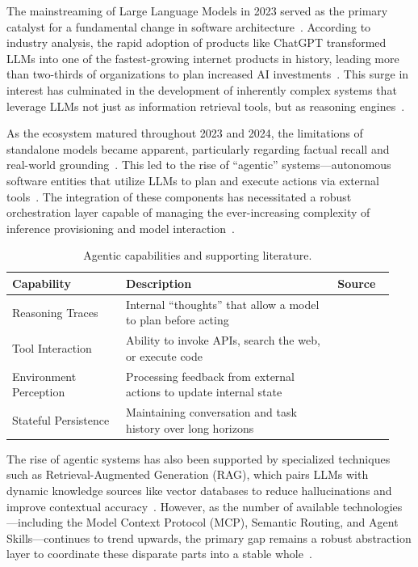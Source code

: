 \documentclass[sigconf,nonacm]{acmart}
\begin{document}
The mainstreaming of Large Language Models in 2023 served as the primary
catalyst for a fundamental change in software
architecture~\cite{benaich2023stateofai}. According to industry analysis,
the rapid adoption of products like ChatGPT transformed LLMs into one of
the fastest-growing internet products in history, leading more than
two-thirds of organizations to plan increased AI
investments~\cite{benaich2023stateofai}. This surge in interest has
culminated in the development of inherently complex systems that leverage
LLMs not just as information retrieval tools, but as reasoning
engines~\cite{crewai2024}.

As the ecosystem matured throughout 2023 and 2024, the limitations of
standalone models became apparent, particularly regarding factual recall and
real-world grounding~\cite{lewis2020rag}. This led to the rise of
``agentic'' systems---autonomous software entities that utilize LLMs to plan
and execute actions via external tools~\cite{yao2023react,schick2023toolformer}.
The integration of these components has necessitated a robust orchestration
layer capable of managing the ever-increasing complexity of inference
provisioning and model interaction~\cite{autogen2024}.

\begin{table}[t]
  \centering
  \caption{Agentic capabilities and supporting literature.}
  \label{tab:agentic-capabilities}
  \small
  \begin{tabular}{@{}p{0.28\linewidth}p{0.52\linewidth}p{0.14\linewidth}@{}}
    \toprule
    \textbf{Capability} & \textbf{Description} & \textbf{Source} \\
    \midrule
    Reasoning Traces & Internal ``thoughts'' that allow a model to plan before acting & \cite{yao2023react} \\
    Tool Interaction & Ability to invoke APIs, search the web, or execute code & \cite{schick2023toolformer} \\
    Environment Perception & Processing feedback from external actions to update internal state & \cite{crewai2024} \\
    Stateful Persistence & Maintaining conversation and task history over long horizons & \cite{langgraph2024} \\
    \bottomrule
  \end{tabular}
\end{table}

The rise of agentic systems has also been supported by specialized
techniques such as Retrieval-Augmented Generation (RAG), which pairs LLMs
with dynamic knowledge sources like vector databases to reduce hallucinations
and improve contextual accuracy~\cite{lewis2020rag}. However, as the number
of available technologies---including the Model Context Protocol (MCP),
Semantic Routing, and Agent Skills---continues to trend upwards, the primary
gap remains a robust abstraction layer to coordinate these disparate parts
into a stable whole~\cite{anthropic2024mcp,wang2025semanticrouter}.
\end{document}
